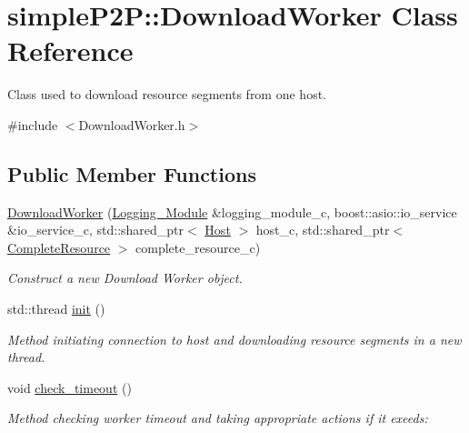 \hypertarget{classsimpleP2P_1_1DownloadWorker}{}\section{simple\+P2P\+:\+:Download\+Worker Class Reference}
\label{classsimpleP2P_1_1DownloadWorker}


Class used to download resource segments from one host.  




{\ttfamily \#include $<$Download\+Worker.\+h$>$}

\subsection*{Public Member Functions}
\begin{DoxyCompactItemize}
\item 
\hyperlink{classsimpleP2P_1_1DownloadWorker_ab56684896ce7f304918045ee96b340b0}{Download\+Worker} (\hyperlink{classsimpleP2P_1_1Logging__Module}{Logging\+\_\+\+Module} \&logging\+\_\+module\+\_\+c, boost\+::asio\+::io\+\_\+service \&io\+\_\+service\+\_\+c, std\+::shared\+\_\+ptr$<$ \hyperlink{classsimpleP2P_1_1Host}{Host} $>$ host\+\_\+c, std\+::shared\+\_\+ptr$<$ \hyperlink{classsimpleP2P_1_1CompleteResource}{Complete\+Resource} $>$ complete\+\_\+resource\+\_\+c)
\begin{DoxyCompactList}\small\item\em Construct a new Download Worker object. \end{DoxyCompactList}\item 
std\+::thread \hyperlink{classsimpleP2P_1_1DownloadWorker_aedf77c7a4944beaee84494c83512551b}{init} ()
\begin{DoxyCompactList}\small\item\em Method initiating connection to host and downloading resource segments in a new thread. \end{DoxyCompactList}\item 
void \hyperlink{classsimpleP2P_1_1DownloadWorker_a03f21eb4f4d1a1e3e87f983ff5e389f7}{check\+\_\+timeout} ()
\begin{DoxyCompactList}\small\item\em Method checking worker timeout and taking appropriate actions if it exeeds\+: \end{DoxyCompactList}\item 
\mbox{\label{classsimpleP2P_1_1DownloadWorker_ae975a4408ee3e8f85c0a067732dd44f0}} 

\end{DoxyCompactItemize}

